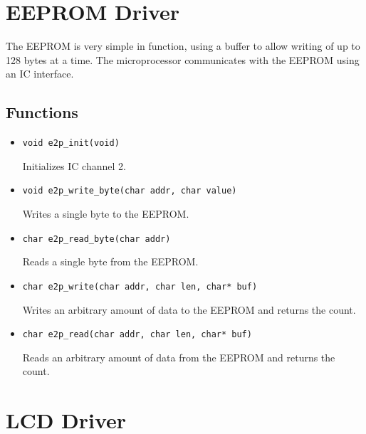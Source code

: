 \section{EEPROM Driver}

The EEPROM is very simple in function, using a buffer to allow writing of up to 128 bytes at a time. The microprocessor communicates with the EEPROM using an IC interface.

\subsection*{Functions}
\begin{itemize}
\item \verb|void e2p_init(void)|

Initializes IC channel 2.

\item \verb|void e2p_write_byte(char addr, char value)|

Writes a single byte to the EEPROM.

\item \verb|char e2p_read_byte(char addr)|

Reads a single byte from the EEPROM.

\item \verb|char e2p_write(char addr, char len, char* buf)|

Writes an arbitrary amount of data to the EEPROM and returns the count.

\item \verb|char e2p_read(char addr, char len, char* buf)|

Reads an arbitrary amount of data from the EEPROM and returns the count.
\end{itemize}

\section{LCD Driver}


